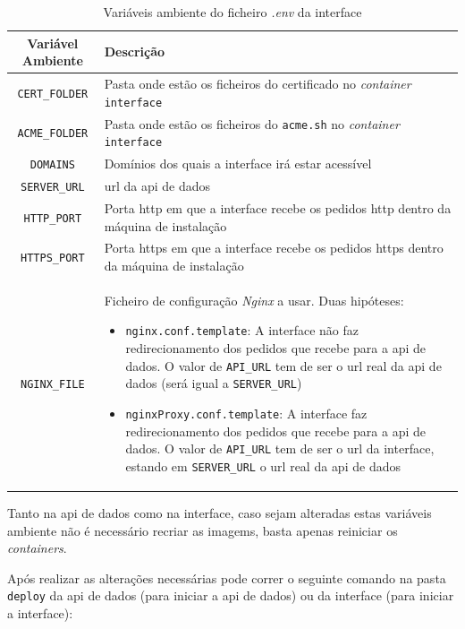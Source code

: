 \begin{table}[H]
\fontsize{10}{12}\selectfont
\begin{tabularx}{\textwidth}{|c|X|}
    \hline
    Variável Ambiente & Descrição \\ \hline
    \texttt{CERT\_FOLDER} & Pasta onde estão os ficheiros do certificado no \textit{container} \texttt{interface} \\ \hline
    \texttt{ACME\_FOLDER} & Pasta onde estão os ficheiros do \texttt{acme.sh} no \textit{container} \texttt{interface} \\ \hline
    \texttt{DOMAINS} & Domínios dos quais a interface irá estar acessível \\ \hline
    \texttt{SERVER\_URL} & \acrshort{url} da \acrshort{api} de dados \\ \hline
    \texttt{HTTP\_PORT} & Porta \acrshort{http} em que a interface recebe os pedidos \acrshort{http} dentro da máquina de instalação \\ \hline
    \texttt{HTTPS\_PORT} & Porta \acrshort{https} em que a interface recebe os pedidos \acrshort{https} dentro da máquina de instalação \\ \hline
    \texttt{NGINX\_FILE} & Ficheiro de configuração \textit{Nginx} a usar. Duas hipóteses:
    \begin{itemize}
        \item \texttt{nginx.conf.template}: A interface não faz redirecionamento dos pedidos que recebe para a \acrshort{api} de dados. O valor de \texttt{API\_URL} tem de ser o \acrshort{url} real da \acrshort{api} de dados (será igual a \texttt{SERVER\_URL})
        \item \texttt{nginxProxy.conf.template}: A interface faz redirecionamento dos pedidos que recebe para a \acrshort{api} de dados. O valor de \texttt{API\_URL} tem de ser o \acrshort{url} da interface, estando em \texttt{SERVER\_URL} o \acrshort{url} real da \acrshort{api} de dados
    \end{itemize}
    \\ \hline
\end{tabularx}
\caption{Variáveis ambiente do ficheiro \textit{.env} da interface}
\end{table}

Tanto na \acrshort{api} de dados como na interface, caso sejam alteradas estas variáveis ambiente não é necessário recriar as imagems, basta apenas reiniciar os \textit{containers}.

Após realizar as alterações necessárias pode correr o seguinte comando na pasta \texttt{deploy} da \acrshort{api} de dados (para iniciar a \acrshort{api} de dados) ou da interface (para iniciar a interface):

